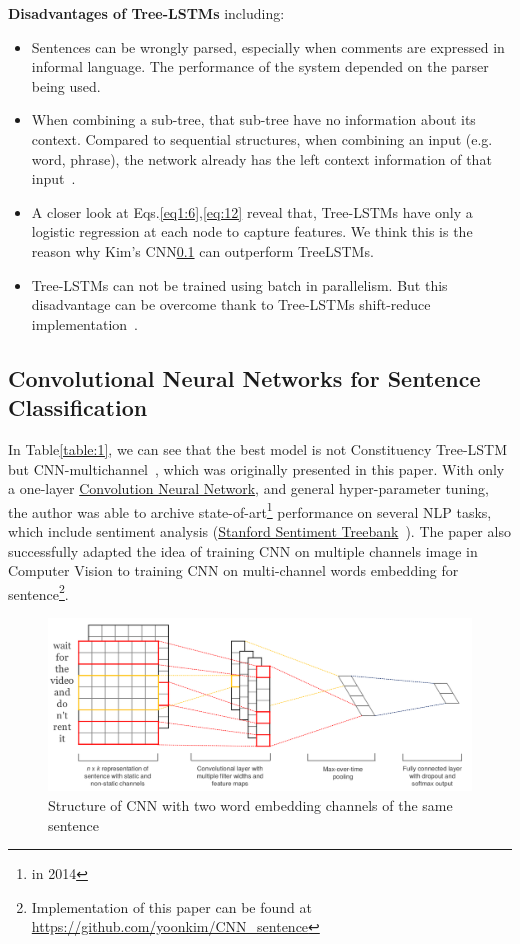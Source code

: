 \textbf{Disadvantages of Tree-LSTMs} including:\label{treelstm-drawback}
\begin{itemize}
\item Sentences can be wrongly parsed, especially when comments are expressed in informal language.
The performance of the system depended on the parser being used.
\item When combining a sub-tree, that sub-tree have no information about its context. 
Compared to sequential structures, when combining an input (e.g. word, phrase), the network already has the left context information of that input~\cite{shift-reduce}.
\item A closer look at Eqs.\eqref{eq1:6},\eqref{eq:12} reveal that, Tree-LSTMs have only a logistic regression at each node to capture features.
We think this is the reason why Kim's CNN\ref{kim-cnn} can outperform TreeLSTMs.  
\item Tree-LSTMs can not be trained using batch in parallelism. But this disadvantage can be overcome thank to Tree-LSTMs shift-reduce implementation~\cite{shift-reduce}.
\end{itemize}


\subsection{Convolutional Neural Networks for Sentence Classification}\label{kim-cnn}
In Table\ref{table:1}, we can see that the best model is not Constituency Tree-LSTM but CNN-multichannel~\cite{KimCNN}, which was originally presented in this paper. 
With only a one-layer \hyperref[sec:cnn]{Convolution Neural Network}, and general hyper-parameter tuning, the author was able to archive state-of-art\footnote{in 2014} performance on several NLP tasks, which include sentiment analysis (\hyperref[sec:sst]{Stanford Sentiment Treebank}~\cite{socher2013recursive}). 
The paper also successfully adapted the idea of training CNN on multiple channels image in Computer Vision to training CNN on multi-channel words embedding for sentence\footnote{Implementation of this paper can be found at \url{https://github.com/yoonkim/CNN\_sentence}}.

\begin{figure}[H]
    \centering
    \includegraphics[scale=0.33]{figure/sentencecnn}
    \caption{Structure of CNN with two word embedding channels of the same sentence}
    \label{fig:multi-cnn}
\end{figure}

